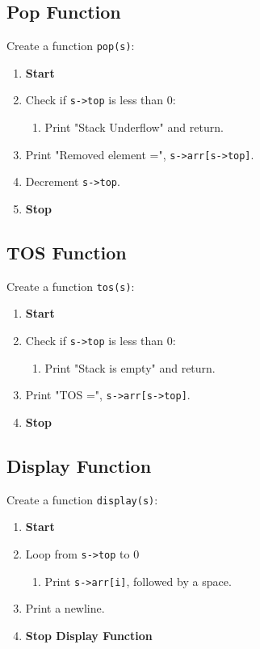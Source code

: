 {  \subsection{Pop Function}
  Create a function \texttt{pop(s)}:
  \begin{enumerate}[label=\arabic*:,left=0pt]
    \item \textbf{Start}
    \item Check if \texttt{s->top} is less than 0:
          \begin{enumerate}[label=2.\arabic*:]
            \item Print "Stack Underflow" and return.
          \end{enumerate}
    \item Print "Removed element =", \texttt{s->arr[s->top]}.
    \item Decrement \texttt{s->top}.
    \item \textbf{Stop}
  \end{enumerate}

  \subsection{TOS Function}
  Create a function \texttt{tos(s)}:
  \begin{enumerate}[label=\arabic*:]
    \item \textbf{Start}
    \item Check if \texttt{s->top} is less than 0:
          \begin{enumerate}[label=2.\arabic*:]
            \item Print "Stack is empty" and return.
          \end{enumerate}
    \item Print "TOS =", \texttt{s->arr[s->top]}.
    \item \textbf{Stop}
  \end{enumerate}

  \subsection{Display Function}
  Create a function \texttt{display(s)}:
  \begin{enumerate}[label=\arabic*:]
    \item \textbf{Start}
    \item Loop from \texttt{s->top} to 0
          \begin{enumerate}[label=2.\arabic*:]
            \item Print \texttt{s->arr[i]}, followed by a space.
          \end{enumerate}
    \item Print a newline.
    \item \textbf{Stop Display Function}
  \end{enumerate}

}
